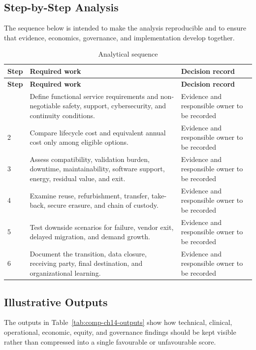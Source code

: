 \subsection{Step-by-Step Analysis}
The sequence below is intended to make the analysis reproducible and to ensure
that evidence, economics, governance, and implementation develop together.

\begin{longtable}{@{}p{}p{}p{}@{}}
\caption{Analytical sequence}
\label{tab:comp-ch14-analysis-steps}\\
\toprule
\textbf{Step} & \textbf{Required work} & \textbf{Decision record} \\
\midrule
\endfirsthead
\toprule
\textbf{Step} & \textbf{Required work} & \textbf{Decision record} \\
\midrule
\endhead
\bottomrule
\endlastfoot
1 & Define functional service requirements and non-negotiable safety, support, cybersecurity, and continuity conditions. & Evidence and responsible owner to be recorded \\
2 & Compare lifecycle cost and equivalent annual cost only among eligible options. & Evidence and responsible owner to be recorded \\
3 & Assess compatibility, validation burden, downtime, maintainability, software support, energy, residual value, and exit. & Evidence and responsible owner to be recorded \\
4 & Examine reuse, refurbishment, transfer, take-back, secure erasure, and chain of custody. & Evidence and responsible owner to be recorded \\
5 & Test downside scenarios for failure, vendor exit, delayed migration, and demand growth. & Evidence and responsible owner to be recorded \\
6 & Document the transition, data closure, receiving party, final destination, and organizational learning. & Evidence and responsible owner to be recorded \\
\end{longtable}

\subsection{Illustrative Outputs}
The outputs in Table~\ref{tab:comp-ch14-outputs} show how technical,
clinical, operational, economic, equity, and governance findings should be kept
visible rather than compressed into a single favourable or unfavourable score.

